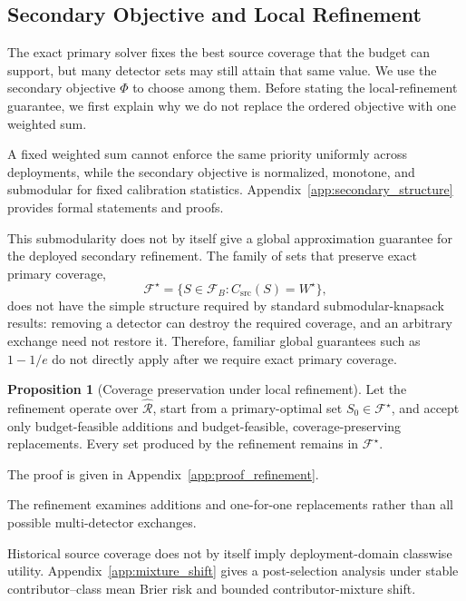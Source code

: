 \documentclass[conference]{IEEEtran}
\theoremstyle{definition}
\newtheorem{proposition}[theorem]{Proposition}
\begin{document}

\subsection{Secondary Objective and Local Refinement}

The exact primary solver fixes the best source coverage that the budget can support, but many detector sets may still attain that same value.
We use the secondary objective $\Phi$ to choose among them.
Before stating the local-refinement guarantee, we first explain why we do not replace the ordered objective with one weighted sum.

A fixed weighted sum cannot enforce the same priority uniformly across deployments, while the secondary objective is normalized, monotone, and submodular for fixed calibration statistics.
Appendix~\ref{app:secondary_structure} provides formal statements and proofs.

This submodularity does not by itself give a global approximation guarantee for the deployed secondary refinement.
The family of sets that preserve exact primary coverage,
\begin{equation}
\mathcal F^\star=\{S\in\mathcal F_B:C_{\mathrm{src}}(S)=W^\star\},
\end{equation}
does not have the simple structure required by standard submodular-knapsack results: removing a detector can destroy the required coverage, and an arbitrary exchange need not restore it.
Therefore, familiar global guarantees such as $1-1/e$ do not directly apply after we require exact primary coverage.

\begin{proposition}[Coverage preservation under local refinement]
\label{prop:coverage_preservation}
Let the refinement operate over $\widehat{\mathcal R}$, start from a primary-optimal set $S_0\in\mathcal F^\star$, and accept only budget-feasible additions and budget-feasible, coverage-preserving replacements. Every set produced by the refinement remains in $\mathcal F^\star$.
\end{proposition}

The proof is given in Appendix~\ref{app:proof_refinement}.

The refinement examines additions and one-for-one replacements rather than all possible multi-detector exchanges.

Historical source coverage does not by itself imply deployment-domain classwise utility.
Appendix~\ref{app:mixture_shift} gives a post-selection analysis under stable contributor--class mean Brier risk and bounded contributor-mixture shift.
\end{document}
